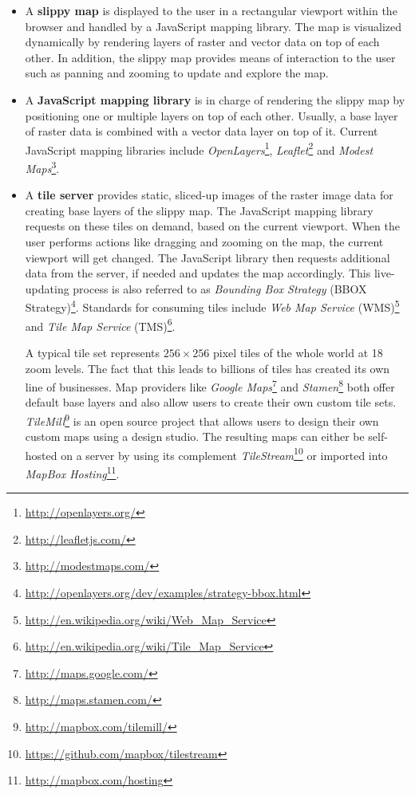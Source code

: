 \begin{itemize}

\item A \textbf{slippy map} is displayed to the user in a rectangular viewport within the browser and handled by a JavaScript mapping library. The map is visualized dynamically by rendering layers of raster and vector data on top of each other. In addition, the slippy map provides means of interaction to the user such as panning and zooming to update and explore the map. 

\item A \textbf{JavaScript mapping library} is in charge of rendering the slippy map by positioning one or multiple layers on top of each other. Usually, a base layer of raster data is combined with a vector data layer on top of it. Current JavaScript mapping libraries include \textit{OpenLayers}\footnote{\url{http://openlayers.org/}}, \textit{Leaflet}\footnote{\url{http://leafletjs.com/}} and \textit{Modest Maps}\footnote{\url{http://modestmaps.com/}}.

\item A \textbf{tile server} provides static, sliced-up images of the raster image data for creating base layers of the slippy map. The JavaScript mapping library requests on these tiles on demand, based on the current viewport. When the user performs actions like dragging and zooming on the map, the current viewport will get changed. The JavaScript library then requests additional data from the server, if needed and updates the map accordingly. This live-updating process is also referred to as \textit{Bounding Box Strategy} (BBOX Strategy)\footnote{\url{http://openlayers.org/dev/examples/strategy-bbox.html}}. Standards for consuming tiles include \textit{Web Map Service} (WMS)\footnote{\url{http://en.wikipedia.org/wiki/Web_Map_Service}} and \textit{Tile Map Service} (TMS)\footnote{\url{http://en.wikipedia.org/wiki/Tile_Map_Service}}.

A typical tile set represents $256 \times 256$ pixel tiles of the whole world at 18 zoom levels. The fact that this leads to billions of tiles has created its own line of businesses. Map providers like \textit{Google Maps}\footnote{\url{http://maps.google.com/}} and \textit{Stamen}\footnote{\url{http://maps.stamen.com/}} both offer default base layers and also allow users to create their own custom tile sets. \textit{TileMill}\footnote{\url{http://mapbox.com/tilemill/}} is an open source project that allows users to design their own custom maps using a design studio. The resulting maps can either be self-hosted on a server by using its complement \textit{TileStream}\footnote{\url{https://github.com/mapbox/tilestream}} or imported into \textit{MapBox Hosting}\footnote{\url{http://mapbox.com/hosting}}.  


\end{itemize}
